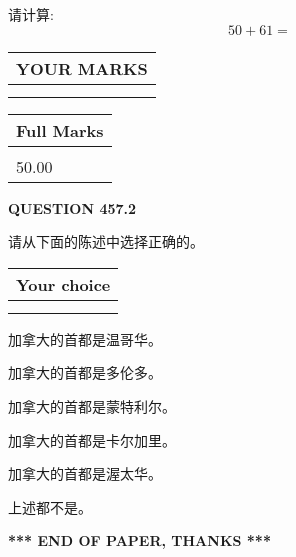 \documentclass{ctexart}
\begin{document}
  
 
请计算:
\begin{equation}
50 +  %
61 = \nonumber
\end{equation}
 

 

 
  
\vspace{0.2in}
  
\noindent\begin{tabular}{|l|}
\hline
 YOUR MARKS  \\
\hline
 \\ 
 \\ 
\hline
\end{tabular}
\hspace{0.05in} \begin{tabular}{|l|}
\hline
 Full Marks  \\
\hline
 \\ 
50.00 \\
\hline
\end{tabular}
{\textbf{\Large{QUESTION
457.2 
}}}
  
  
请从下面的陈述中选择正确的。
  
  
\noindent\hspace{3.0in} \begin{tabular}{|l|}
\hline
Your choice \\
\hline
 \\ 
 \\ 
\hline
\end{tabular}
  
  
 
 
加拿大的首都是温哥华。
 
 
加拿大的首都是多伦多。
 
 
加拿大的首都是蒙特利尔。
 
 
加拿大的首都是卡尔加里。
 
 
加拿大的首都是渥太华。
 
 
 上述都不是。
 
 
   
   
 \vspace{0.2in}
 
   
   
   
   
\vspace{1.0in} 
{\textbf{\large{ *** END OF PAPER, THANKS *** }}} 
   
\end{document}
